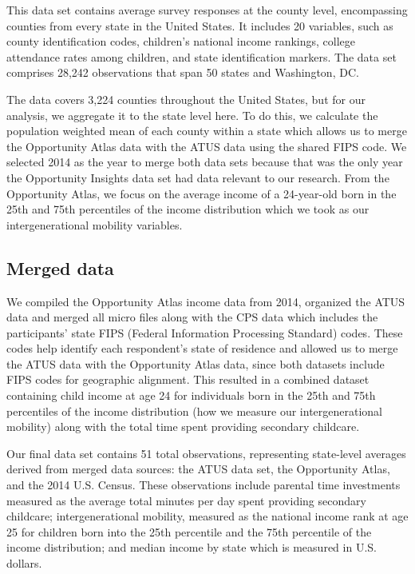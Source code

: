 \documentclass[12pt]{article}
\begin{document}
This data set contains average survey responses at the county level, encompassing counties from every state in the United States. It includes 20 variables, such as county identification codes, children's national income rankings, college attendance rates among children, and state identification markers. The data set comprises 28,242 observations that span 50 states and Washington, DC. 

The data covers 3,224 counties throughout the United States, but for our analysis, we aggregate it to the state level here. To do this, we calculate the population weighted mean of each county within a state which allows us to merge the Opportunity Atlas data with the ATUS data using the shared FIPS code. We selected 2014 as the year to merge both data sets because that was the only year the Opportunity Insights data set had data relevant to our research. From the Opportunity Atlas, we focus on the average income of a 24-year-old born in the 25th and 75th percentiles of the income distribution which we took as our intergenerational mobility variables.
  
\subsection{Merged data}
\label{sec:data}

We compiled the Opportunity Atlas income data from 2014, organized the ATUS data and merged all micro files along with the CPS data which includes the participants' state FIPS (Federal Information Processing Standard) codes. These codes help identify each respondent's state of residence and allowed us to merge the ATUS data with the Opportunity Atlas data, since both datasets include FIPS codes for geographic alignment. This resulted in a combined dataset containing child income at age 24 for individuals born in the 25th and 75th percentiles of the income distribution (how we measure our intergenerational mobility) along with the total time spent providing secondary childcare.

Our final data set contains 51 total observations, representing state-level averages derived from merged data sources: the ATUS data set, the Opportunity Atlas, and the 2014 U.S. Census. These observations include parental time investments measured as the average total minutes per day spent providing secondary childcare; intergenerational mobility, measured as the national income rank at age 25 for children born into the 25th percentile and the 75th percentile of the income distribution; and median income by state which is measured in U.S. dollars.
\end{document}

